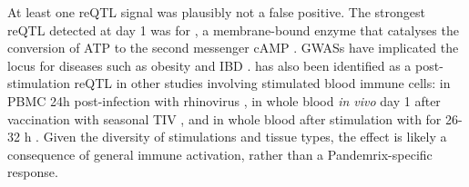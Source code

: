 At least one \gls{reQTL} signal was plausibly not a false positive.
The strongest \gls{reQTL} detected at day 1 was for , a membrane-bound enzyme that catalyses the conversion of ATP to the second messenger cAMP \autocite{wu2016AdenylateCyclaseNew}.
\Glspl{GWAS} have implicated the  locus for diseases such as obesity \autocite{wu2016AdenylateCyclaseNew} and \gls{IBD} \autocite{delange2017GenomewideAssociationStudy}.
 has also been identified as a post-stimulation \gls{reQTL} in other studies involving stimulated blood immune cells:
in \gls{PBMC} 24h post-infection with rhinovirus \autocite{caliskan2015HostGeneticVariation},
in whole blood \textit{in vivo} day 1 after vaccination with seasonal \gls{TIV} \autocite{franco2013IntegrativeGenomicAnalysis},
and in whole blood after stimulation with  for 26-32 h \autocite{manry2017DecipheringGeneticControl}.
%
Given the diversity of stimulations and tissue types, the effect is likely a consequence of general immune activation, rather than a Pandemrix-specific response.

